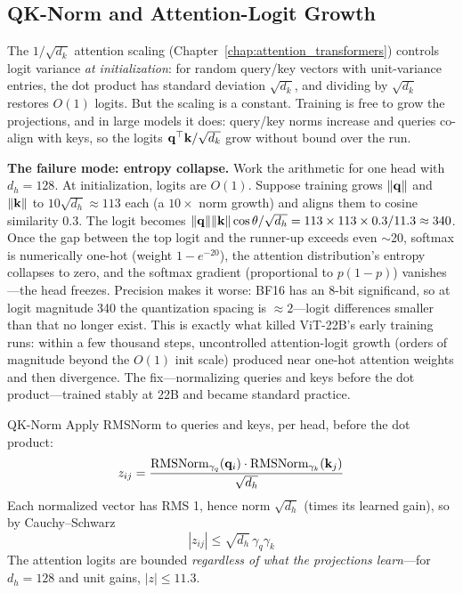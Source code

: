 \subsection{QK-Norm and Attention-Logit Growth}
\label{subsec:qknorm}

The $1/\sqrt{d_k}$ attention scaling (Chapter~\ref{chap:attention_transformers}) controls logit variance \textit{at initialization}: for random query/key vectors with unit-variance entries, the dot product has standard deviation $\sqrt{d_k}$, and dividing by $\sqrt{d_k}$ restores $O(1)$ logits. But the scaling is a constant. Training is free to grow the projections, and in large models it does: query/key norms increase and queries co-align with keys, so the logits $\mathbf{q}^\top \mathbf{k} / \sqrt{d_k}$ grow without bound over the run.

\textbf{The failure mode: entropy collapse.} Work the arithmetic for one head with $d_h = 128$. At initialization, logits are $O(1)$. Suppose training grows $\|\mathbf{q}\|$ and $\|\mathbf{k}\|$ to $10\sqrt{d_h} \approx 113$ each (a $10\times$ norm growth) and aligns them to cosine similarity $0.3$. The logit becomes $\|\mathbf{q}\|\|\mathbf{k}\|\cos\theta/\sqrt{d_h} = 113 \times 113 \times 0.3 / 11.3 \approx 340$. Once the gap between the top logit and the runner-up exceeds even $\sim$20, softmax is numerically one-hot (weight $1 - e^{-20}$), the attention distribution's entropy collapses to zero, and the softmax gradient (proportional to $p(1-p)$) vanishes---the head freezes. Precision makes it worse: BF16 has an 8-bit significand, so at logit magnitude 340 the quantization spacing is $\approx 2$---logit differences smaller than that no longer exist. This is exactly what killed ViT-22B's early training runs: within a few thousand steps, uncontrolled attention-logit growth (orders of magnitude beyond the $O(1)$ init scale) produced near one-hot attention weights and then divergence. The fix---normalizing queries and keys before the dot product---trained stably at 22B and became standard practice.

\begin{mathresult}{QK-Norm}
Apply RMSNorm to queries and keys, per head, before the dot product:
\begin{equation}
z_{ij} = \frac{\mathrm{RMSNorm}_{\gamma_q}(\mathbf{q}_i) \cdot \mathrm{RMSNorm}_{\gamma_k}(\mathbf{k}_j)}{\sqrt{d_h}}
\end{equation}
Each normalized vector has RMS 1, hence norm $\sqrt{d_h}$ (times its learned gain), so by Cauchy--Schwarz
\begin{equation}
|z_{ij}| \leq \sqrt{d_h}\,\gamma_q \gamma_k
\end{equation}
The attention logits are bounded \emph{regardless of what the projections learn}---for $d_h = 128$ and unit gains, $|z| \leq 11.3$.
\end{mathresult}

